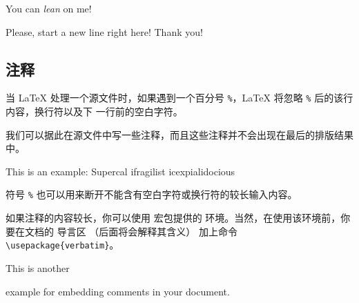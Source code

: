 \begin{example}
You can \textsl{lean} on me!
\end{example}
\begin{example}
Please, start a new line
right here!\newline
Thank you!
\end{example}

\subsection{注释}


当 \LaTeX{} 处理一个源文件时，如果遇到一个百分号 \verb|%|，\LaTeX{} 将忽略 \verb|%| 后的该行内容，换行符以及下
一行前的空白字符。


我们可以据此在源文件中写一些注释，而且这些注释并不会出现在最后的排版结果中。

\begin{example}
This is an %
example: Supercal%
              ifragilist%
    icexpialidocious
\end{example}


符号 \texttt{\%} 也可以用来断开不能含有空白字符或换行符的较长输入内容。


如果注释的内容较长，你可以使用  宏包提供的  环境。当然，在使用该环境前，你要在文档的
导言区 （后面将会解释其含义） 加上命令 \verb|\usepackage{verbatim}|。
\begin{example}
This is another
\begin{comment}
rather stupid,
but helpful
\end{comment}
example for embedding
comments in your document.
\end{example}

